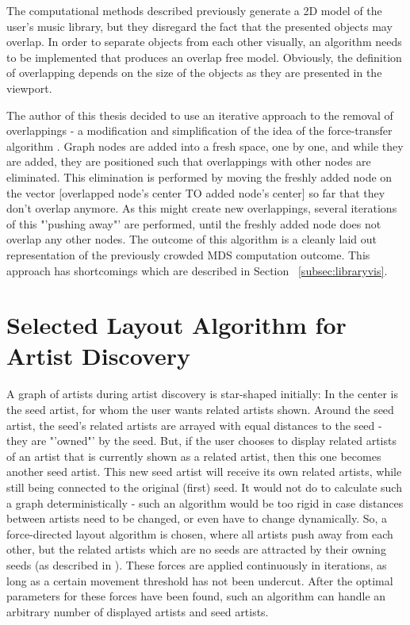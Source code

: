 The computational methods described previously generate a 2D model of the user's music library, but they disregard the fact that the presented objects may overlap. In order to separate objects from each other visually, an algorithm needs to be implemented that produces an overlap free model. Obviously, the definition of overlapping depends on the size of the objects as they are presented in the viewport.

The author of this thesis decided to use an iterative approach to the removal of overlappings - a modification and simplification of the idea of the force-transfer algorithm \cite{Huang03force-transfer:a}. Graph nodes are added into a fresh space, one by one, and while they are added, they are positioned such that overlappings with other nodes are eliminated. This elimination is performed by moving the freshly added node on the vector [overlapped node's center TO added node's center] so far that they don't overlap anymore. As this might create new overlappings, several iterations of this "'pushing away"' are performed, until the freshly added node does not overlap any other nodes. The outcome of this algorithm is a cleanly laid out representation of the previously crowded MDS computation outcome. This approach has shortcomings which are described in Section ~\ref{subsec:libraryvis}.

\section{Selected Layout Algorithm for Artist Discovery}
\label{sec:selected-algorithm-discovery}

A graph of artists during artist discovery is star-shaped initially: In the center is the seed artist, for whom the user wants related artists shown. Around the seed artist, the seed's related artists are arrayed with equal distances to the seed - they are "'owned"' by the seed. But, if the user chooses to display related artists of an artist that is currently shown as a related artist, then this one becomes another seed artist. This new seed artist will receive its own related artists, while still being connected to the original (first) seed. It would not do to calculate such a graph deterministically - such an algorithm would be too rigid in case distances between artists need to be changed, or even have to change dynamically. So, a force-directed layout algorithm is chosen, where all artists push away from each other, but the related artists which are no seeds are attracted by their owning seeds (as described in \cite{Kobourov04}). These forces are applied continuously in iterations, as long as a certain movement threshold has not been undercut. After the optimal parameters for these forces have been found, such an algorithm can handle an arbitrary number of displayed artists and seed artists.

